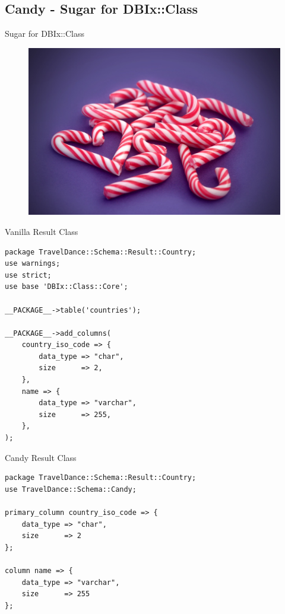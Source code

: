 \subsection{Candy - Sugar for DBIx::Class}

\begin{frame}{Sugar for DBIx::Class}
\begin{figure}[!ht]
\centering
\includegraphics[width=0.8\linewidth]{img/candy-cane.jpg}
\end{figure}
\end{frame}

\begin{frame}[fragile]{Vanilla Result Class}
\begin{lstlisting}
package TravelDance::Schema::Result::Country;
use warnings;
use strict;
use base 'DBIx::Class::Core';

__PACKAGE__->table('countries');

__PACKAGE__->add_columns(
    country_iso_code => {
        data_type => "char",
        size      => 2,
    },
    name => {
        data_type => "varchar",
        size      => 255,
    },
);
\end{lstlisting}
\end{frame}

\begin{frame}[fragile]{Candy Result Class}
\begin{lstlisting}
package TravelDance::Schema::Result::Country;
use TravelDance::Schema::Candy;

primary_column country_iso_code => {
    data_type => "char",
    size      => 2
};

column name => {
    data_type => "varchar",
    size      => 255
};
\end{lstlisting}
\end{frame}

